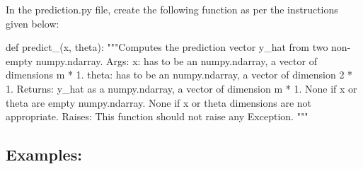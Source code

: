 \documentclass[]{article}
\newenvironment{Shaded}{\begin{snugshade}}{\end{snugshade}}
\newcommand{\CommentTok}[1]{\textcolor[rgb]{0.48,0.49,0.49}{#1}}
\newcommand{\KeywordTok}[1]{\textcolor[rgb]{0.81,0.81,0.76}{#1}}
\newcommand{\NormalTok}[1]{\textcolor[rgb]{0.81,0.81,0.76}{#1}}
\begin{document}
In the prediction.py file, create the following function as per the
instructions given below:

\begin{Shaded}
\begin{Highlighting}[]
\KeywordTok{def}\NormalTok{ predict_(x, theta):}
    \CommentTok{"""Computes the prediction vector y_hat from two non-empty numpy.ndarray.}
\CommentTok{    Args:}
\CommentTok{      x: has to be an numpy.ndarray, a vector of dimensions m * 1.}
\CommentTok{      theta: has to be an numpy.ndarray, a vector of dimension 2 * 1.}
\CommentTok{    Returns:}
\CommentTok{      y_hat as a numpy.ndarray, a vector of dimension m * 1.}
\CommentTok{      None if x or theta are empty numpy.ndarray.}
\CommentTok{      None if x or theta dimensions are not appropriate.}
\CommentTok{    Raises:}
\CommentTok{      This function should not raise any Exception.}
\CommentTok{    """}
\end{Highlighting}
\end{Shaded}

\hypertarget{examples}{%
\subsection{Examples:}\label{examples}}
\end{document}

